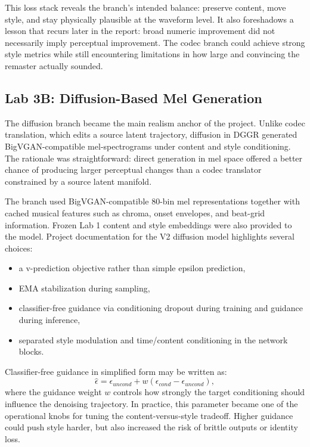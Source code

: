 \documentclass[conference]{IEEEtran}
\begin{document}
This loss stack reveals the branch's intended balance: preserve content, move style, and stay physically plausible at the waveform level. It also foreshadows a lesson that recurs later in the report: broad numeric improvement did not necessarily imply perceptual improvement. The codec branch could achieve strong style metrics while still encountering limitations in how large and convincing the remaster actually sounded.

\subsection{Lab 3B: Diffusion-Based Mel Generation}
The diffusion branch became the main realism anchor of the project. Unlike codec translation, which edits a source latent trajectory, diffusion in DGGR generated BigVGAN-compatible mel-spectrograms under content and style conditioning. The rationale was straightforward: direct generation in mel space offered a better chance of producing larger perceptual changes than a codec translator constrained by a source latent manifold.

The branch used BigVGAN-compatible 80-bin mel representations together with cached musical features such as chroma, onset envelopes, and beat-grid information. Frozen Lab 1 content and style embeddings were also provided to the model. Project documentation for the V2 diffusion model highlights several choices:
\begin{itemize}[leftmargin=1.5em]
    \item a v-prediction objective rather than simple epsilon prediction,
    \item EMA stabilization during sampling,
    \item classifier-free guidance via conditioning dropout during training and guidance during inference,
    \item separated style modulation and time/content conditioning in the network blocks.
\end{itemize}

Classifier-free guidance in simplified form may be written as:
\begin{equation}
\hat{\epsilon} = \epsilon_{uncond} + w(\epsilon_{cond} - \epsilon_{uncond}),
\end{equation}
where the guidance weight $w$ controls how strongly the target conditioning should influence the denoising trajectory. In practice, this parameter became one of the operational knobs for tuning the content-versus-style tradeoff. Higher guidance could push style harder, but also increased the risk of brittle outputs or identity loss.
\end{document}

